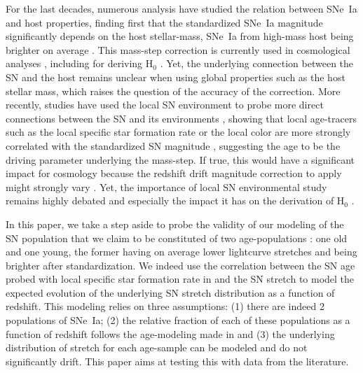 \documentclass[]{aa} %
\newcommand{\nn}[1]{{\textcolor[rgb]{1, 0.27, 0}{#1}}}
\begin{document}
For the last decades, numerous analysis have studied the relation between SNe~Ia
and host properties\nn{,} finding first that the standardized SNe~Ia magnitude
significantly depends on the host stellar-mass, SNe~Ia from high-mass host
\nn{being brighter on average}
\cite[e.g.][]{kelly2010, sullivan2010, childress2013, betoule2014, rigault2018, kim19}.
This mass-step correction is currently used in cosmological analyses
\citep[e.g.][]{betoule2014, scolnic2018a}, including for deriving H$_0$
\citep{riess2016, riess2019}. Yet, the underlying connection between the SN and
the host remains unclear when using global properties such as the host stellar
mass, which raises the question of the accuracy of the correction. More
recently, studies have used the local SN environment to probe more direct
connections between the SN and its environments \citep{rigault2013}\nn{,}
showing that local age-tracers such as the local specific star formation rate or
the local color are more strongly correlated with the standardized SN magnitude
\citep{rigault2018, roman2018, kim18}, suggesting the age to be the driving parameter
underlying the mass-step. If true, this would have a significant impact for
cosmology because the redshift drift magnitude correction to apply might
strongly vary \citep{rigault2013,childress2014,scolnic2018a}.  Yet, the
importance of local SN environmental study remains highly debated
\cite[e.g.][]{jones2015,jones2019} and especially the impact it has on the
derivation of H$_0$ \citep{jones2015,riess2016,riess2018,rose2019}. 

In this paper, we take a step aside to probe the validity of our modeling of the
SN population that we claim to be constituted of two age-populations
\citep{rigault2013,rigault2015,rigault2018}: one old and one young, the former
having on average lower lightcurve stretches and being brighter after
standardization. We indeed use the correlation between the SN age probed with
local specific star formation rate in \cite{rigault2018} and the SN stretch to
model the expected evolution of the underlying SN stretch distribution as a
function of redshift. This modeling relies on three assumptions: (1) there
\nn{are indeed} 2 populations of SNe~Ia; (2) the relative fraction of each of
these populations as a function of redshift follows the age-modeling made in
\citep{rigault2018} and (3) the underlying distribution of stretch for each
age-sample can be modeled and do not significantly drift. This paper aims at
testing this with data from the literature. 
\end{document}
